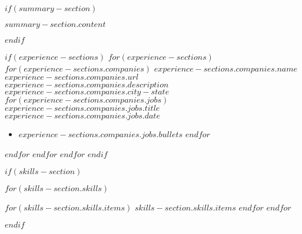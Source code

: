 

\newcommand{\headerinfo}{
    \textbf{\Large $contact.name.first$ $contact.name.last$} \hfill
    $contact.address.county$, $contact.address.state$ \hfill
    ($contact.phone.area_code$) $contact.phone.number$ \hfill
    \href{$contact.email.link$}{$contact.email.address$} \hfill
    \href{$contact.linkedin.url$}{$contact.linkedin.text$} \hfill
    \href{$contact.gitlab.url$}{$contact.gitlab.text$}
}



\thispagestyle{firstpageheaderstyle}

\pagestyle{subsequentpageheaderstyle}

$if(summary-section)$
\begin{justify}
\vspace{-7.5pt}
$summary-section.content$
\end{justify}
$endif$

$if(experience-sections)$
$for(experience-sections)$
    $for(experience-sections.companies)$
        \company
        {$experience-sections.companies.name$}
        {$experience-sections.companies.url$}
        {$experience-sections.companies.description$}
        {$experience-sections.companies.city-state$}
        $for(experience-sections.companies.jobs)$
            \jobtitle
            {$experience-sections.companies.jobs.title$}
            {$experience-sections.companies.jobs.date$}
            \begin{itemize}
            \setlength\topsep{0pt}
            \setlength\partopsep{0pt}
            \setlength\itemsep{5pt}
            \setlength\parsep{1pt}
            \setlength\parskip{-5pt}
            $for(experience-sections.companies.jobs.bullets)$
                \item $experience-sections.companies.jobs.bullets$
            $endfor$
            \end{itemize}
            \vspace{-15pt}
        $endfor$
        \vspace{15pt}
    $endfor$
    \vspace{-1pt}
$endfor$
$endif$

$if(skills-section)$
\vspace{-13pt}
\begin{description}[align=right,labelwidth=\skillswidth]
\setlength\itemsep{-2pt}
$for(skills-section.skills)$
    \item [$skills-section.skills.heading$:]
    \commasep{\ensuremath{\cdot}}
    $for(skills-section.skills.items)$
        $skills-section.skills.items$
    $endfor$
    \endcommasep
$endfor$
\end{description}
$endif$

